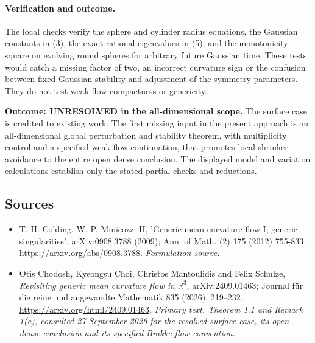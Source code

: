 \documentclass[11pt]{article}
\begin{document}
\paragraph{Verification and outcome.}
The local checks verify the sphere and cylinder radius equations, the
Gaussian constants in (3), the exact rational eigenvalues in (5), and
the monotonicity square on evolving round spheres for arbitrary
future Gaussian time. These tests would catch a missing factor of two,
an incorrect curvature sign or the confusion between fixed Gaussian
stability and adjustment of the symmetry parameters. They do not test
weak-flow compactness or genericity.

\textbf{Outcome: UNRESOLVED in the all-dimensional scope.} The surface
case is credited to existing work. The first missing input in the
present approach is an all-dimensional global perturbation and
stability theorem, with multiplicity control and a specified weak-flow
continuation, that promotes local shrinker avoidance to the entire
open dense conclusion. The displayed model and variation calculations
establish only the stated partial checks and reductions.
\subsection{Sources}
\begin{itemize}
\item[S1]T. H. Colding, W. P. Minicozzi II, 'Generic mean curvature flow I; generic singularities', arXiv:0908.3788 (2009); Ann. of Math. (2) 175 (2012) 755-833.
\url{https://arxiv.org/abs/0908.3788}.
\textit{Formulation source.}
\item[E1]Otis Chodosh, Kyeongsu Choi, Christos Mantoulidis and Felix Schulze, \emph{Revisiting generic mean curvature flow in $\mathbb R^3$}, arXiv:2409.01463; Journal f\"ur die reine und angewandte Mathematik 835 (2026), 219--232.
\url{https://arxiv.org/html/2409.01463}.
\textit{Primary text, Theorem 1.1 and Remark 1(c), consulted 27 September 2026 for the resolved surface case, its open dense conclusion and its specified Brakke-flow convention.}
\end{itemize}
\end{document}
